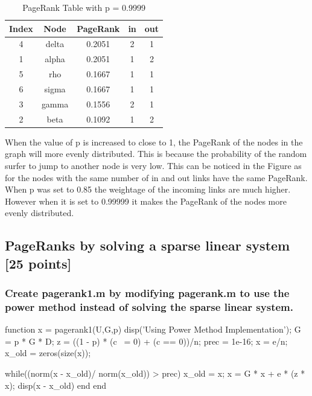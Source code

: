 \documentclass[unicode,11pt,a4paper,oneside,numbers=endperiod,openany]{scrartcl}
\begin{document}
\noindent
\begin{table}[H]
    \centering
    \begin{tabular}{|c|c|c|c|c|}
        \hline
        Index & Node  & PageRank & in & out \\
        \hline
        4     & delta & 0.2051   & 2  & 1   \\
        \hline
        1     & alpha & 0.2051   & 1  & 2   \\
        \hline
        5     & rho   & 0.1667   & 1  & 1   \\
        \hline
        6     & sigma & 0.1667   & 1  & 1   \\
        \hline
        3     & gamma & 0.1556   & 2  & 1   \\
        \hline
        2     & beta  & 0.1092   & 1  & 2   \\
        \hline
    \end{tabular}
    \caption{PageRank Table with p = 0.9999}
    \label{tab:pagerank-table-85}
\end{table}



When the value of p is increased to close to 1, the PageRank of the nodes in the graph will more evenly distributed. This is because the probability of the random surfer to jump to another node is very low. This can be noticed in the Figure  as for the nodes with the same number of in and out links have the same PageRank. When p was set to 0.85 the weightage of the incoming links are much higher. However when it is set to 0.99999 it makes the PageRank of the nodes more evenly distributed. \\

\subsection{PageRanks by solving a sparse linear system [25 points]}

\subsubsection{Create pagerank1.m by modifying pagerank.m to use the power method instead of solving the sparse
    linear system.}

\begin{mcode}
    function x = pagerank1(U,G,p)
    disp('Using Power Method Implementation\n');
    G = p * G * D;
    z = ((1 - p) * (c ~= 0) + (c == 0))/n;
    prec = 1e-16;
    x = e/n;
    x_old = zeros(size(x));

    while((norm(x - x_old)/ norm(x_old)) > prec)
    x_old = x;
    x = G * x + e * (z * x);
    disp(x - x_old)
    end
    end
\end{mcode}
\end{document}
